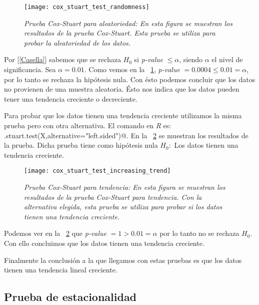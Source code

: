 \begin{figure}[H]
\centering
\texttt{[image: cox\_stuart\_test\_randomness]} %
\caption[\textit{Prueba Cox-Stuart para aleatoriedad}]{\textit{Prueba Cox-Stuart para aleatoriedad: En esta figura se muestran los resultados de la prueba Cox-Stuart. Esta prueba se utiliza para probar la aleatoriedad de los datos.}}\label{coxStuartTest_randomness}
\end{figure}

Por [\ref{Casella}] sabemos que se rechaza $H_{0}$ si \textit{p-value} $ \leqslant \alpha$, siendo $\alpha$ el nivel de significancia. Sea $\alpha = 0.01$. Como vemos en la \figurename{~\ref{coxStuartTest_randomness}},  \textit{p-value} $ = 0.0004 \leqslant 0.01 = \alpha$, por lo tanto se rechaza la hipótesis nula. Con ésto podemos concluir que los datos no provienen de una muestra aleatoria. Ésto nos indica que los datos pueden tener una tendencia creciente o decreciente.

Para probar que los datos tienen una tendencia creciente utilizamos la misma prueba pero con otra alternativa. El comando en \textit{R} es: \verb@cox.stuart.test(X,alternative="left.sided")@. En la \figurename{~\ref{coxStuartTest_trend}} se muestran los resultados de la prueba. Dicha prueba tiene como hipótesis nula $H_{0}:$ Los datos tienen una tendencia creciente.

\begin{figure}[H]
\centering
\texttt{[image: cox\_stuart\_test\_increasing\_trend]} %
\caption[\textit{Prueba Cox-Stuart para tendencia}]{\textit{Prueba Cox-Stuart para tendencia: En esta figura se muestran los resultados de la prueba Cox-Stuart para tendencia. Con la alternativa elegida, esta prueba se utiliza para probar si los datos tienen una tendencia creciente.}}\label{coxStuartTest_trend}
\end{figure}

Podemos ver en la \figurename{~\ref{coxStuartTest_trend}} que \textit{p-value} $ = 1 > 0.01 = \alpha$ por lo tanto no se rechaza $H_{0}$. Con ello concluimos que los datos tienen una tendencia creciente.

Finalmente la conclusión a la que llegamos con estas pruebas es que los datos tienen una tendencia lineal creciente.


\subsection{Prueba de estacionalidad}

